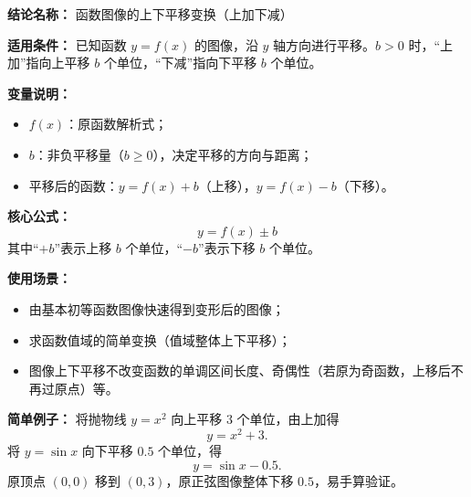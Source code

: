 \textbf{结论名称：} 函数图像的上下平移变换（上加下减）

\textbf{适用条件：} 已知函数 \(y=f(x)\) 的图像，沿 \(y\) 轴方向进行平移。\(b>0\) 时，“上加”指向上平移 \(b\) 个单位，“下减”指向下平移 \(b\) 个单位。

\textbf{变量说明：}
\begin{itemize}
\item \(f(x)\)：原函数解析式；
\item \(b\)：非负平移量（\(b\geq 0\)），决定平移的方向与距离；
\item 平移后的函数：\(y=f(x)+b\)（上移），\(y=f(x)-b\)（下移）。
\end{itemize}

\textbf{核心公式：}
\[
\boxed{y = f(x) \pm b}
\]
其中“\(+b\)”表示上移 \(b\) 个单位，“\(-b\)”表示下移 \(b\) 个单位。

\textbf{使用场景：}
\begin{itemize}
\item 由基本初等函数图像快速得到变形后的图像；
\item 求函数值域的简单变换（值域整体上下平移）；
\item 图像上下平移不改变函数的单调区间长度、奇偶性（若原为奇函数，上移后不再过原点）等。
\end{itemize}

\textbf{简单例子：}
将抛物线 \(y=x^2\) 向上平移 \(3\) 个单位，由上加得
\[
y = x^2 + 3.
\]
将 \(y=\sin x\) 向下平移 \(0.5\) 个单位，得
\[
y = \sin x - 0.5.
\]
原顶点 \((0,0)\) 移到 \((0,3)\)，原正弦图像整体下移 \(0.5\)，易手算验证。